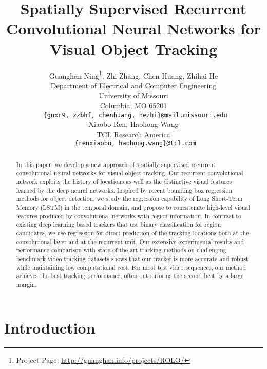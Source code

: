 \documentclass{article}
\title{Spatially Supervised Recurrent Convolutional Neural Networks for Visual Object Tracking}
\author{
  Guanghan Ning\thanks{Project Page:
  	\href{http://guanghan.info/projects/ROLO/}{http://guanghan.info/projects/ROLO/}}, Zhi Zhang, Chen Huang, Zhihai He \\
  Department of Electrical and Computer Engineering\\
  University of Missouri\\
  Columbia, MO 65201 \\
  \texttt{ \{gnxr9, zzbhf, chenhuang, hezhi\}@mail.missouri.edu} \\
\And
Xiaobo Ren, Haohong Wang \\
  TCL Research America\\
  \texttt{ \{renxiaobo, haohong.wang\}@tcl.com} \\
}
\begin{document}

\maketitle

\begin{abstract}
In this paper, we develop a new approach of spatially supervised recurrent convolutional neural networks for visual object tracking.  Our recurrent convolutional network exploits the history of locations as well as the distinctive visual features learned by the deep neural networks.
Inspired by recent bounding box regression methods for object detection, we study  the regression capability of Long Short-Term Memory (LSTM) in the temporal domain, and propose to concatenate high-level visual features produced by convolutional networks with region information. In contrast to existing deep learning based trackers that use binary classification for region candidates, we use regression for  direct prediction of the tracking locations both at the convolutional layer and at the recurrent unit.  Our extensive experimental results and performance comparison  with  state-of-the-art tracking methods on challenging benchmark video tracking datasets shows that our tracker is more accurate and robust while maintaining low computational cost. For most test video sequences, our method achieves the best tracking performance, often outperforms the second best by a large margin.

\end{abstract}

\section{Introduction}
\label{intro}
\end{document}
